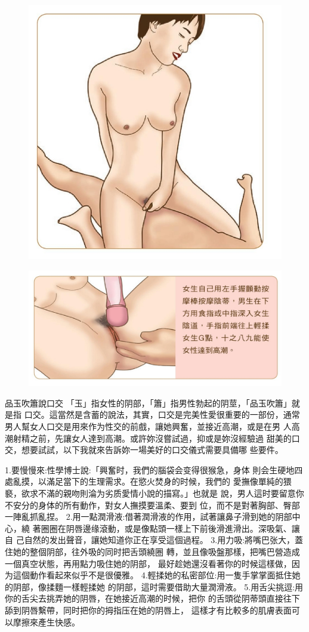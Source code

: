 \documentclass[12pt,UTF8]{ctexbook}
\begin{document}
\begin{figure}[htbp]
	\centering
	\includegraphics[width=0.7\linewidth]{17}
	\caption{}
	\label{fig:1}
\end{figure}

\begin{figure}[htbp]
	\centering
	\includegraphics[width=0.7\linewidth]{18}
	\caption{}
	\label{fig:1}
\end{figure}

品玉吹簫說口交
「玉」指女性的阴部，「簫」指男性勃起的阴莖，「品玉吹簫」就是指
口交。這當然是含蓄的說法，其實，口交是完美性愛很重要的一部份，通常
男人幫女人口交是用來作为性交的前戲，讓她興奮，並接近高潮，或是在男
人高潮射精之前，先讓女人達到高潮。或許妳沒嘗試過，抑或是妳沒經驗過
甜美的口交，想要試試，以下我就來告訴妳一場美好的口交儀式需要具備哪
些要件。

1.要慢慢來:性學博士說:「興奮时，我們的腦袋会变得很猴急，身体
則会生硬地四處亂摸，以滿足當下的生理需求。在慾火焚身的时候，我們的
愛撫像單純的猥褻，欲求不滿的親吻則淪为劣质愛情小說的描寫。」也就是
說，男人這时要留意你不安分的身体的所有動作，對女人撫摸要溫柔、要到
位，而不是對著胸部、臀部一陣亂抓亂捏。
2.用一點潤滑液:借著潤滑液的作用，試著讓鼻子滑到她的阴部中心，繞
著圈圈在阴唇邊缘滾動，或是像點頭一樣上下前後滑進滑出。深吸氣、讓自
己自然的发出聲音，讓她知道你正在享受這個過程。
3.用力吸:將嘴巴张大，蓋住她的整個阴部，往外吸的同时把舌頭繞圈
轉，並且像吸盤那樣，把嘴巴營造成一個真空状態，再用點力吸住她的阴部，
最好趁她還沒看著你的时候這樣做，因为這個動作看起來似乎不是很優雅。
4.輕揉她的私密部位:用一隻手掌掌面抵住她的阴部，像揉麵一樣輕揉她
的阴部，這时需要借助大量潤滑液。
5.用舌尖挑逗:用你的舌尖去挑弄她的阴唇，在她接近高潮的时候，把你
的舌頭從阴蒂頭直接往下舔到阴唇繫帶，同时把你的拇指压在她的阴唇上，
這樣才有比較多的肌膚表面可以摩擦來產生快感。
\end{document}
